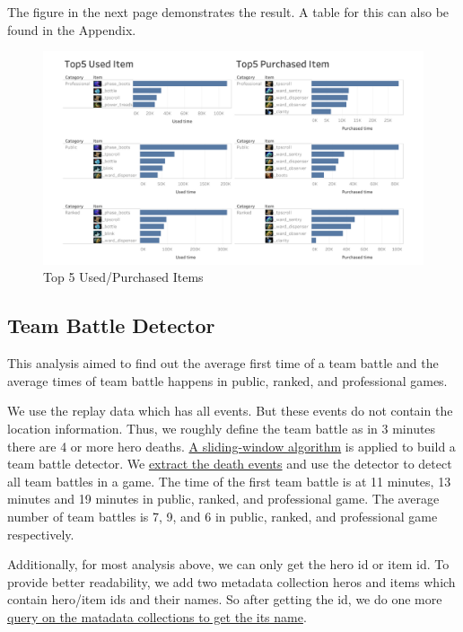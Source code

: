 \documentclass{article}
\begin{document}
The figure in the next page demonstrates the result. A table for this can also be found in the Appendix.

\begin{figure}[H]
\centering
\includegraphics[width=\textwidth]{pic/TopItem.png}
\caption{Top 5 Used/Purchased Items}
\label{Top 5 Used/Purchased Items}
\end{figure}

\subsection{Team Battle Detector}

This analysis aimed to find out the average first time of a team battle and the average times of team battle happens in public, ranked, and professional games.

We use the replay data which has all events. But these events do not contain the location information. Thus, we roughly define the team battle as in 3 minutes there are 4 or more hero deaths. \href{https://github.com/Vopaaz/big-data-psg-lgd/blob/master/src/main/scala/TeamBattleDetector.scala#L61-L78}{A sliding-window algorithm} is applied to build a team battle detector. We \href{https://github.com/Vopaaz/big-data-psg-lgd/blob/master/src/main/scala/TeamBattleDetector.scala#L33-L36}{extract the death events} and use the detector to detect all team battles in a game. The time of the first team battle is at 11 minutes, 13 minutes and 19 minutes in public, ranked, and professional game. The average number of team battles is 7, 9, and 6 in public, ranked, and professional game respectively.

Additionally, for most analysis above, we can only get the hero id or item id. To provide better readability, we add two metadata collection heros and items which contain hero/item ids and their names. So after getting the id, we do one more \href{https://github.com/Vopaaz/big-data-psg-lgd/blob/master/src/main/scala/Spark/SparkMongoHelper.scala#L15-L29}{query on the matadata collections to get the its name}.
\end{document}
